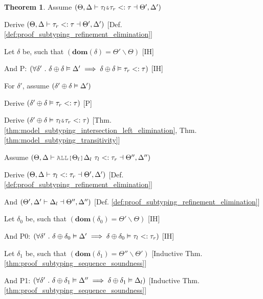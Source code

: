 \documentclass[acmsmall]{acmart}
\theoremstyle{definition}
\newtheorem{theorem}{Theorem}[section]
\begin{document}
\begin{theorem}

  \item \N Assume $(
    \Theta, \Delta \entails \tau_{l}\J{\&}\tau_{r}  \subtypes \tau \given \Theta', \Delta'
  )$
  \item \I \N Derive $(
    \Theta, \Delta \vdash \tau_r <: \tau \dashv \Theta', \Delta' 
  )$ [Def. \ref{def:proof_subtyping_refinement_elimination}]

  \item \I \N Let $\delta$ be, such that $(
    \textbf{dom}(\delta) = \Theta' \backslash \Theta
  )$ [IH]
  \item \I \N And P: $(
    \forall \delta' \ .\  
    \delta \oplus \delta \vDash \Delta' 
    \implies 
    \delta \oplus \delta \vDash \tau_r <: \tau
  )$ [IH]
  \item \I \N For $\delta'$, assume $(\delta' \oplus \delta \vDash \Delta')$
  \item \I\I \N Derive $(\delta' \oplus \delta \vDash \tau_r <: \tau)$ [P]
  \item \I\I \N Derive $(
    \delta' \oplus \delta \satisfies \tau_l \J{\&} \tau_r \subtypes \tau 
  )$ [Thm. \ref{thm:model_subtyping_intersection_left_elimination}, Thm. \ref{thm:model_subtyping_transitivity}]


  \item \N Assume $(
    \Theta, \Delta \entails 
    \J{ALL[}\Theta_l\J{]} \Delta_l\ \tau_l
    \subtypes 
    \tau_r
    \given \Theta'', \Delta'' 
  )$
  \item \I \N Derive $(
    \Theta, \Delta \vdash \tau_l <: \tau_r \dashv \Theta', \Delta'
  )$ [Def. \ref{def:proof_subtyping_refinement_elimination}]
  \item \I \N And $(
    \Theta', \Delta' \vdash \Delta_l \dashv \Theta'', \Delta'' 
  )$ [Def. \ref{def:proof_subtyping_refinement_elimination}]

  \item \I \N Let $\delta_0$ be, such that $(
    \textbf{dom}(\delta_0) = \Theta' \backslash \Theta
  )$ [IH]
  \item \I \N And P0: $(
    \forall \delta' \ .\  
    \delta \oplus \delta_0 \vDash \Delta' 
    \implies 
    \delta \oplus \delta_0 \vDash \tau_l <: \tau_r
  )$ [IH]

  \item \I \N Let $\delta_1$ be, such that $(
    \textbf{dom}(\delta_1) = \Theta'' \backslash \Theta'
  )$ [Inductive Thm. \ref{thm:proof_subtyping_sequence_soundness}]
  \item \I \N And P1: $(
    \forall \delta' \ .\  
    \delta \oplus \delta_1 \vDash \Delta'' 
    \implies 
    \delta \oplus \delta_1 \vDash \Delta_l 
  )$ [Inductive Thm. \ref{thm:proof_subtyping_sequence_soundness}]



\end{theorem}
\end{document}
